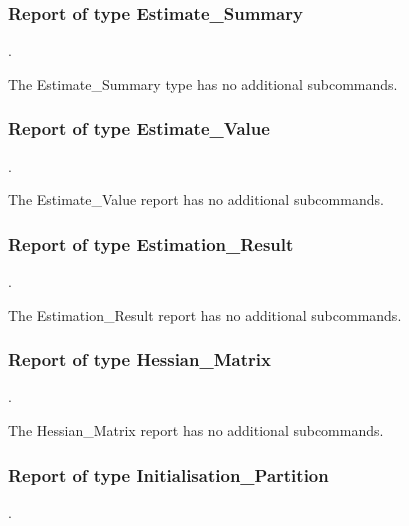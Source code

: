 
\subsubsection{Report of type Estimate\_Summary}
.
\label{syntax:Report-EstimateSummary}


The Estimate\_Summary type has no additional subcommands.

\subsubsection{Report of type Estimate\_Value}
.
\label{syntax:Report-EstimateValue}


The Estimate\_Value report has no additional subcommands.

\subsubsection{Report of type Estimation\_Result}
.
\label{syntax:Report-EstimationResult}


The Estimation\_Result report has no additional subcommands.

\subsubsection{Report of type Hessian\_Matrix}
.
\label{syntax:Report-HessianMatrix}

The Hessian\_Matrix report has no additional subcommands.

\subsubsection{Report of type Initialisation\_Partition}
.
\label{syntax:Report-InitialisationPartition}

